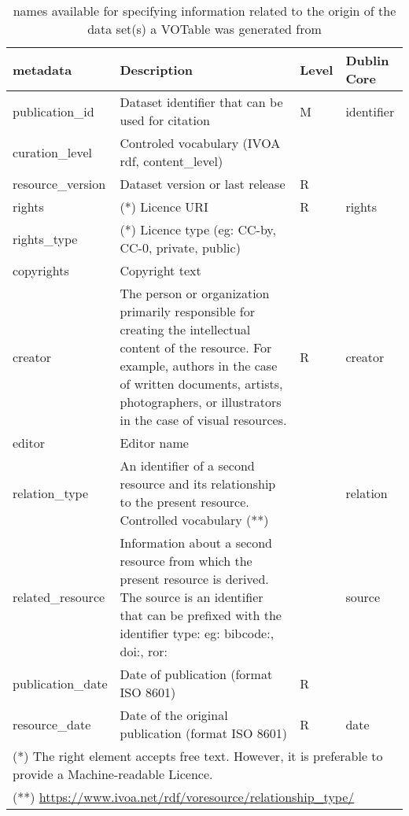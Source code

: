 \documentclass[11pt,a4paper]{ivoa}
\begin{document}
\begin{table}
\begin{tabular}{|l|p{5cm}|l|l|}  \hline
\textbf{metadata} & \textbf{Description} & \textbf{Level} & \textbf{Dublin Core}\\ \hline
publication\_id    & Dataset identifier that can be used for citation& M  & identifier\\ \hline
curation\_level    & Controled vocabulary
                   (IVOA rdf, content\_level) &  &  \\ \hline
resource\_version  & Dataset version or last release & R & \\ \hline
rights             & (*) Licence URI & R & rights\\ \hline
rights\_type       & (*) Licence type (eg: CC-by, CC-0, private, public) &  &  \\ \hline
copyrights         & Copyright text &  & \\ \hline
creator            & The person or organization primarily responsible for creating the
                     intellectual content of the resource.  For example, authors in the
                     case of written documents, artists, photographers, or illustrators in
                     the case of visual resources. & R & creator\\ \hline
editor             & Editor name &  & \\ \hline
relation\_type     & An identifier of a second resource and its relationship to the
                     present resource.
                     Controlled vocabulary (**)& & relation\\ \hline
related\_resource  & Information about a second resource from which the present resource
                     is derived. The source is an identifier that can be prefixed with the identifier type: eg: bibcode:, doi:, ror: &  & source\\ \hline
publication\_date  & Date of publication (format ISO 8601) &  R &  \\ \hline
resource\_date     & Date of the original publication (format ISO 8601) & R & date\\ \hline
\multicolumn{4}{p{\textwidth}}{\footnotesize(*) The right element	accepts free
text. However,	it is preferable to provide	a Machine-readable
Licence.}\\
\multicolumn{4}{p{\textwidth}}{\footnotesize(**) \url{https://www.ivoa.net/rdf/voresource/relationship_type/}}
\end{tabular}
\caption{ names available for specifying information
related to the origin of the data set(s) a VOTable was generated from}
\label{tab:origin-names}
\end{table}
\end{document}
